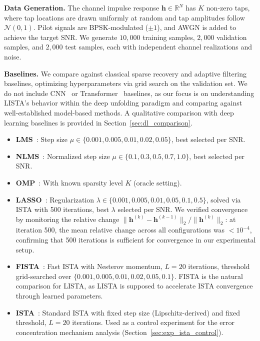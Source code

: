 \documentclass[a4paper,fleqn]{cas-sc}
\begin{document}
\textbf{Data Generation.} The channel impulse response $\mathbf{h} \in \mathbb{R}^N$ has $K$ non-zero taps, where tap locations are drawn uniformly at random and tap amplitudes follow $\mathcal{N}(0, 1)$. Pilot signals are BPSK-modulated ($\pm 1$), and AWGN is added to achieve the target SNR. We generate $10{,}000$ training samples, $2{,}000$ validation samples, and $2{,}000$ test samples, each with independent channel realizations and noise.

\textbf{Baselines.} We compare against classical sparse recovery and adaptive filtering baselines, optimizing hyperparameters via grid search on the validation set. We do not include CNN~\citep{ye2018power, gao2019deep} or Transformer~\citep{zhang2020transformer} baselines, as our focus is on understanding LISTA's behavior within the deep unfolding paradigm and comparing against well-established model-based methods. A qualitative comparison with deep learning baselines is provided in Section~\ref{sec:dl_comparison}.
\begin{itemize}
\item \textbf{LMS}~\citep{widrow1960adaptive}: Step size $\mu \in \{0.001, 0.005, 0.01, 0.02, 0.05\}$, best selected per SNR.
\item \textbf{NLMS}~\citep{nagumo1967weight}: Normalized step size $\mu \in \{0.1, 0.3, 0.5, 0.7, 1.0\}$, best selected per SNR.
\item \textbf{OMP}~\citep{tropp2007signal}: With known sparsity level $K$ (oracle setting).
\item \textbf{LASSO}~\citep{tibshirani1996regression}: Regularization $\lambda \in \{0.001, 0.005, 0.01, 0.05, 0.1, 0.5\}$, solved via ISTA with 500 iterations, best $\lambda$ selected per SNR. We verified convergence by monitoring the relative change $\|\mathbf{h}^{(k)} - \mathbf{h}^{(k-1)}\|_2 / \|\mathbf{h}^{(k)}\|_2$: at iteration 500, the mean relative change across all configurations was $< 10^{-4}$, confirming that 500 iterations is sufficient for convergence in our experimental setup.
\item \textbf{FISTA}~\citep{beck2009fast}: Fast ISTA with Nesterov momentum, $L=20$ iterations, threshold grid-searched over $\{0.001, 0.005, 0.01, 0.02, 0.05, 0.1\}$. FISTA is the natural comparison for LISTA, as LISTA is supposed to accelerate ISTA convergence through learned parameters.
\item \textbf{ISTA}~\citep{daubechies2004iterative}: Standard ISTA with fixed step size (Lipschitz-derived) and fixed threshold, $L=20$ iterations. Used as a control experiment for the error concentration mechanism analysis (Section~\ref{sec:exp_ista_control}).
\end{itemize}
\end{document}
